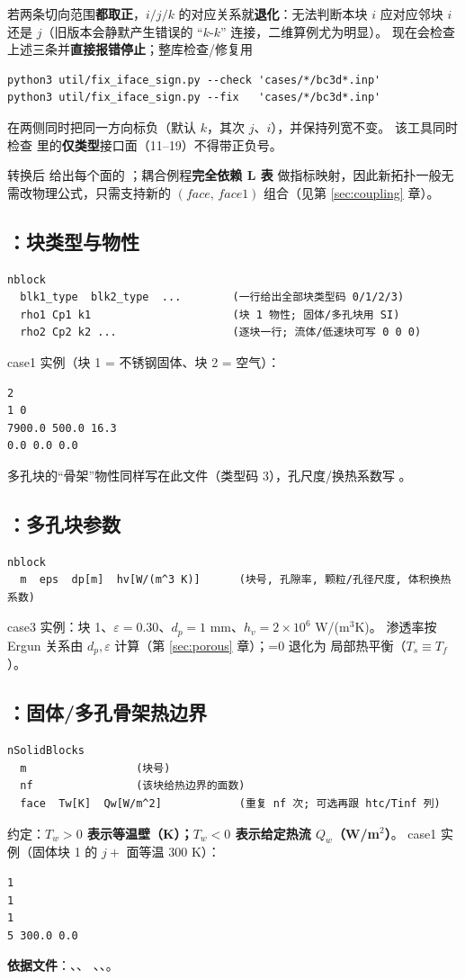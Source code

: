 若两条切向范围\textbf{都取正}，$i/j/k$ 的对应关系就\textbf{退化}：无法判断本块 $i$
应对应邻块 $i$ 还是 $j$（旧版本会静默产生错误的 “$k$-$k$” 连接，二维算例尤为明显）。
 现在会检查上述三条并\textbf{直接报错停止}；整库检查/修复用
\begin{lstlisting}
python3 util/fix_iface_sign.py --check 'cases/*/bc3d*.inp'
python3 util/fix_iface_sign.py --fix   'cases/*/bc3d*.inp'
\end{lstlisting}
 在两侧同时把同一方向标负（默认 $k$，其次 $j$、$i$），并保持列宽不变。
该工具同时检查  里的\textbf{仅类型}接口面（11--19）不得带正负号。

转换后  给出每个面的 ；耦合例程\textbf{完全依赖 L 表}
做指标映射，因此新拓扑一般无需改物理公式，只需支持新的 $(face,\,face1)$ 组合（见第 \ref{sec:coupling} 章）。

\subsection{：块类型与物性}
\begin{lstlisting}
nblock
  blk1_type  blk2_type  ...        (一行给出全部块类型码 0/1/2/3)
  rho1 Cp1 k1                      (块 1 物性; 固体/多孔块用 SI)
  rho2 Cp2 k2 ...                  (逐块一行; 流体/低速块可写 0 0 0)
\end{lstlisting}
case1 实例（块 1 = 不锈钢固体、块 2 = 空气）：
\begin{lstlisting}
2
1 0
7900.0 500.0 16.3
0.0 0.0 0.0
\end{lstlisting}
多孔块的“骨架”物性同样写在此文件（类型码 3），孔尺度/换热系数写 。

\subsection{：多孔块参数}
\begin{lstlisting}
nblock
  m  eps  dp[m]  hv[W/(m^3 K)]      (块号, 孔隙率, 颗粒/孔径尺度, 体积换热系数)
\end{lstlisting}
case3 实例：块 1、$\varepsilon=0.30$、$d_p=1$ mm、$h_v=2\times10^{6}$ W/(m$^{3}$K)。
渗透率按 Ergun 关系由 $d_p,\varepsilon$ 计算（第 \ref{sec:porous} 章）；=0 退化为
局部热平衡（$T_s\equiv T_f$）。

\subsection{：固体/多孔骨架热边界}
\begin{lstlisting}
nSolidBlocks
  m                 (块号)
  nf                (该块给热边界的面数)
  face  Tw[K]  Qw[W/m^2]            (重复 nf 次; 可选再跟 htc/Tinf 列)
\end{lstlisting}
约定：\textbf{$T_w>0$ 表示等温壁（K）；$T_w<0$ 表示给定热流 $Q_w$（W/m$^{2}$）}。
case1 实例（固体块 1 的 $j+$ 面等温 300 K）：
\begin{lstlisting}
1
1
1
5 300.0 0.0
\end{lstlisting}

\noindent\textbf{依据文件}：、、
、、。
